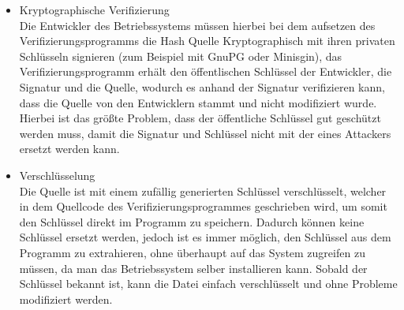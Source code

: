 \begin{itemize}
\item Kryptographische Verifizierung\\
  Die Entwickler des Betriebssystems müssen hierbei bei dem aufsetzen des Verifizierungsprogramms die Hash Quelle Kryptographisch mit ihren privaten Schlüsseln signieren (zum Beispiel mit GnuPG oder Minisgin), das Verifizierungsprogramm erhält den öffentlischen Schlüssel der Entwickler, die Signatur und die Quelle, wodurch es anhand der Signatur verifizieren kann, dass die Quelle von den Entwicklern stammt und nicht modifiziert wurde.\\
  Hierbei ist das größte Problem, dass der öffentliche Schlüssel gut geschützt werden muss, damit die Signatur und Schlüssel nicht mit der eines Attackers ersetzt werden kann.
\item Verschlüsselung\\
  Die Quelle ist mit einem zufällig generierten Schlüssel verschlüsselt, welcher in dem Quellcode des Verifizierungsprogrammes geschrieben wird, um somit den Schlüssel direkt im Programm zu speichern. Dadurch können keine Schlüssel ersetzt werden, jedoch ist es immer möglich, den Schlüssel aus dem Programm zu extrahieren, ohne überhaupt auf das System zugreifen zu müssen, da man das Betriebssystem selber installieren kann. Sobald der Schlüssel bekannt ist, kann die Datei einfach verschlüsselt und ohne Probleme modifiziert werden.
\end{itemize}
